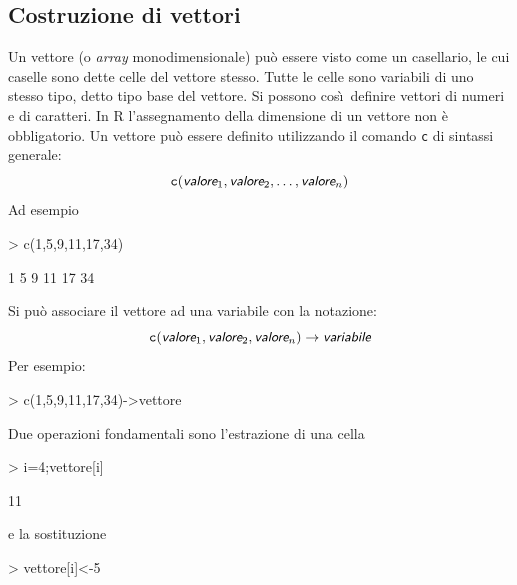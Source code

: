 \documentclass[onecolumn,11pt]{book}
\newcommand{\varia}[1]{\textsl{\textsf{#1}}}
\begin{document}
\subsection{Costruzione di vettori}  Un vettore (o \textit{array} monodimensionale) 
pu\`o essere visto come un casellario, le cui caselle sono dette celle del vettore stesso. Tutte le celle sono variabili di uno stesso tipo, detto tipo base del vettore. Si possono cos\`\i\  definire vettori di numeri e di caratteri. 
 In \textsf{R} l'assegnamento della dimensione di un vettore non \`e obbligatorio. %
Un vettore pu\`o  essere definito utilizzando il comando \texttt{c} di sintassi generale:  
\begin{equation*}
\texttt{c}(\varia{valore}_1, \varia{valore}_2, \ldots,\varia{valore}_n)
\end{equation*}
Ad esempio
\begin{Schunk}
\begin{Sinput}
>  c(1,5,9,11,17,34)
\end{Sinput}
\begin{Soutput}
[1]  1  5  9 11 17 34
\end{Soutput}
\end{Schunk}
Si pu\`o associare il vettore ad una variabile con la notazione:
\begin{equation*}
\texttt{c}(\varia{valore}_1, \varia{valore}_2, \varia{valore}_n)\rightarrow \varia{variabile}
\end{equation*}
Per esempio:
\begin{Schunk}
\begin{Sinput}
> c(1,5,9,11,17,34)->vettore
\end{Sinput}
\end{Schunk}
Due operazioni fondamentali sono l'estrazione di una cella
\begin{Schunk}
\begin{Sinput}
> i=4;vettore[i]
\end{Sinput}
\begin{Soutput}
[1] 11
\end{Soutput}
\end{Schunk}
e la sostituzione
\begin{Schunk}
\begin{Sinput}
> vettore[i]<-5
\end{Sinput}
\end{Schunk}
\end{document}
